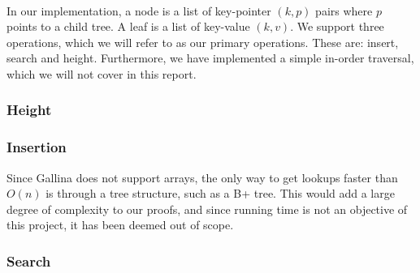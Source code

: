 \paragraph{}
In our implementation, a node is a list of key-pointer $(k, p)$ pairs where $p$ points to a child tree. A leaf is a list of key-value $(k, v)$. We support three operations, which we will refer to as our primary operations. These are: insert, search and height. Furthermore, we have implemented a simple in-order traversal, which we will not cover in this report.

\subsubsection{Height}


\subsubsection{Insertion}
Since Gallina does not support arrays, the only way to get lookups faster than $O(n)$ is through a tree structure, such as a B+ tree. This would add a large degree of complexity to our proofs, and since running time is not an objective of this project, it has been deemed out of scope.

\subsubsection{Search}

